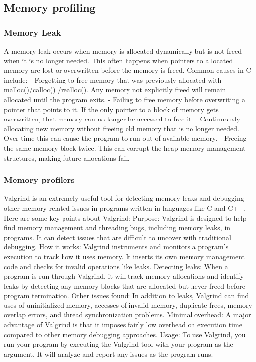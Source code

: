 \documentclass [ titlepage ]{article}
\begin{document}
\subsection{Memory profiling}
\subsubsection{Memory Leak}
A memory leak occurs when memory is allocated dynamically but is not freed when it is no longer needed. This often happens when pointers to allocated memory are lost or overwritten before the memory is freed. Common causes in C include: \newline
- Forgetting to free memory that was previously allocated with malloc()/calloc()  /realloc(). Any memory not explicitly freed will remain allocated until the program exits. \newline
- Failing to free memory before overwriting a pointer that points to it. If the only pointer to a block of memory gets overwritten, that memory can no longer be accessed to free it. \newline
- Continuously allocating new memory without freeing old memory that is no longer needed. Over time this can cause the program to run out of available memory. \newline
- Freeing the same memory block twice. This can corrupt the heap memory management structures, making future allocations fail. \newline

\subsubsection{Memory profilers}
Valgrind is an extremely useful tool for detecting memory leaks and debugging other memory-related issues in programs written in languages like C and C++. Here are some key points about Valgrind: \newline
Purpose: Valgrind is designed to help find memory management and threading bugs, including memory leaks, in programs. It can detect issues that are difficult to uncover with traditional debugging.\newline
How it works: Valgrind instruments and monitors a program's execution to track how it uses memory. It inserts its own memory management code and checks for invalid operations like leaks. \newline
Detecting leaks: When a program is run through Valgrind, it will track memory allocations and identify leaks by detecting any memory blocks that are allocated but never freed before program termination. \newline
Other issues found: In addition to leaks, Valgrind can find uses of uninitialized memory, accesses of invalid memory, duplicate frees, memory overlap errors, and thread synchronization problems. \newline
Minimal overhead: A major advantage of Valgrind is that it imposes fairly low overhead on execution time compared to other memory debugging approaches. \newline
Usage: To use Valgrind, you run your program by executing the Valgrind tool with your program as the argument. It will analyze and report any issues as the program runs. \newline
\end{document}
